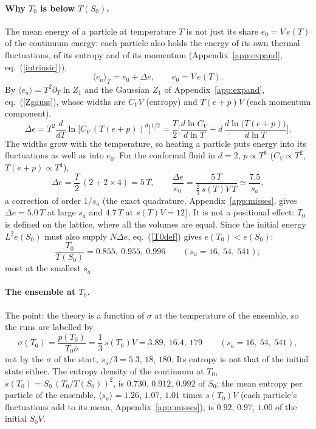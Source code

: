 \documentclass[11pt,aps,preprint,nofootinbib,superscriptaddress,tightenlines]{revtex4-2}
\newcommand{\avg}[1]{\langle #1\rangle}
\def\st{\begin{equation}}
\def\stp{\end{equation}}
\def\Eq#1{eq.~(\ref{#1})}
\def\App#1{Appendix~\ref{#1}}
\let\oldparagraph\paragraph
\renewcommand{\paragraph}{\par\bigskip\oldparagraph}
\begin{document}
\paragraph{Why $T_0$ is below $T(S_0)$.}  The mean energy of a particle at temperature $T$ is not just its share $e_0=V\,e(T)$ of the continuum energy: each
particle also holds the energy of its own thermal fluctuations, of its entropy and of its momentum (\App{app:expand}, \Eq{intrinsic}),
\st
\avg{e_a}_T=e_0+\Delta e,\qquad e_0=V\,e(T) .
\label{eparticle}
\stp
By $\avg{e_a}=T^2\partial_T\ln Z_1$ and the Gaussian $Z_1$ of \App{app:expand}, \Eq{Zgauss}, whose widths are $C_VV$ (entropy) and $T(e+p)V$ (each momentum component),
\st
\Delta e=T^2\frac{d}{dT}\ln\big[C_V\,(T(e+p))^d\big]^{1/2}
=\frac T2\Big[\frac{d\ln C_V}{d\ln T}+d\,\frac{d\ln\big(T(e+p)\big)}{d\ln T}\Big] .
\label{Deltae}
\stp
The widths grow with the temperature, so heating a particle puts energy into its fluctuations as well as into $e_0$.  For the conformal fluid in $d=2$,
$p\propto T^3$ ($C_V\propto T^2$, $T(e+p)\propto T^4$),
\st
\Delta e=\frac T2\,(2+2\times4)=5\,T,\qquad \frac{\Delta e}{e_0}=\frac{5\,T}{\tfrac23\,s(T)V\,T}\simeq\frac{7.5}{s_a},
\stp
a correction of order $1/s_a$ (the exact quadrature, \App{app:misses}, gives $\Delta e=5.0\,T$ at large $s_a$ and $4.7\,T$ at $s(T)V=12$).  It is not a positional
effect: $T_0$ is defined on the lattice, where all the volumes are equal.  Since the initial energy $L^2e(S_0)$ must also supply $N\Delta e$, \Eq{T0def} gives
$e(T_0)<e(S_0)$:
\st
\frac{T_0}{T(S_0)}=0.855,\ 0.955,\ 0.996\qquad(s_a=16,\ 54,\ 541),
\stp
most at the smallest $s_a$.

\paragraph{The ensemble at $T_0$.}  The point: the theory is a function of $\sigma$ at the temperature of the ensemble, so the runs are labelled by
\st
\sigma(T_0)=\frac{p(T_0)}{T_0\bar n}=\frac13\,s(T_0)V=3.89,\ 16.4,\ 179\qquad(s_a=16,\ 54,\ 541),
\stp
not by the $\sigma$ of the start, $s_a/3=5.3$, $18$, $180$.  Its entropy is not that of the initial state either.  The entropy density of the continuum at $T_0$,
$s(T_0)=S_0\,(T_0/T(S_0))^2$, is $0.730$, $0.912$, $0.992$ of $S_0$; the mean entropy per particle of the ensemble, $\avg{s_a}=1.26$, $1.07$, $1.01$ times $s(T_0)V$
(each particle's fluctuations add to its mean, \App{app:misses}), is $0.92$, $0.97$, $1.00$ of the initial $S_0V$.
\end{document}
